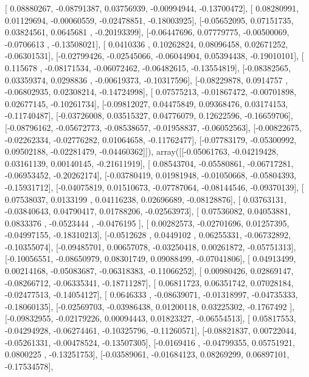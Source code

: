 \documentclass{article}
\begin{document}
       [ 0.08880267, -0.08791387,  0.03756939, -0.00994944, -0.13700472],
       [ 0.08280991,  0.01129694, -0.00060559, -0.02478851, -0.18003925],
       [-0.05652095,  0.07151735,  0.03824561,  0.0645681 , -0.20193399],
       [-0.06447696,  0.07779775, -0.00500069, -0.0706613 , -0.13508021],
       [ 0.0410336 ,  0.10262824,  0.08096458,  0.02671252, -0.06301531],
       [-0.02799426, -0.02545066, -0.06044904,  0.05394438, -0.19010101],
       [ 0.115678  , -0.08171534, -0.06072462, -0.06482615, -0.13554819],
       [-0.08382565,  0.03359374,  0.0298836 , -0.00619373, -0.10317596],
       [-0.08229878,  0.0914757 , -0.06802935,  0.02308214, -0.14724998],
       [ 0.07575213, -0.01867472, -0.00701898,  0.02677145, -0.10261734],
       [-0.09812027,  0.04475849,  0.09368476,  0.03174153, -0.11740487],
       [-0.03726008,  0.03515327,  0.04776079,  0.12622596, -0.16659706],
       [-0.08796162, -0.05672773, -0.08538657, -0.01958837, -0.06052563],
       [-0.00822675, -0.02262334, -0.02776282,  0.01064658, -0.11762477],
       [-0.07783179, -0.05300992,  0.09502188, -0.02281479, -0.04460362]]), array([[-0.05061763, -0.04219428,  0.03161139,  0.00140145, -0.21611919],
       [ 0.08543704, -0.05580861, -0.06717281, -0.06953452, -0.20262174],
       [-0.03780419,  0.01981948, -0.01050668, -0.05804393, -0.15931712],
       [-0.04075819,  0.01510673, -0.07787064, -0.08144546, -0.09370139],
       [ 0.07538037,  0.0133199 ,  0.04116238,  0.02696689, -0.08128876],
       [ 0.03763131, -0.03840643,  0.04790417,  0.01788206, -0.02563973],
       [ 0.07536082,  0.04053881,  0.0833376 , -0.0523444 , -0.0476195 ],
       [ 0.00282573, -0.02701696,  0.01257395, -0.04997155, -0.18310213],
       [-0.0512628 ,  0.0449102 ,  0.06255331, -0.06732892, -0.10355074],
       [-0.09485701,  0.00657078, -0.03250418,  0.00261872, -0.05751313],
       [-0.10056551, -0.08650979,  0.08301749,  0.09088499, -0.07041806],
       [ 0.04913499,  0.00214168, -0.05083687, -0.06318383, -0.11066252],
       [ 0.00980426,  0.02869147, -0.08266712, -0.06335341, -0.18711287],
       [ 0.06811723,  0.06351742,  0.07028184, -0.02477513, -0.14054127],
       [ 0.0646333 , -0.08639071, -0.01318997, -0.04735333, -0.18060135],
       [-0.02569703, -0.03986438,  0.01200118,  0.03225302, -0.1767492 ],
       [-0.09832955, -0.02179226,  0.00094443,  0.01823327, -0.06554513],
       [ 0.05817553, -0.04294928, -0.06274461, -0.10325796, -0.11260571],
       [-0.08821837,  0.00722044, -0.05261331, -0.00478524, -0.13507305],
       [-0.0169416 , -0.04799355,  0.05751921,  0.0800225 , -0.13251753],
       [-0.03589061, -0.01684123,  0.08269299,  0.06897101, -0.17534578],
\end{document}
